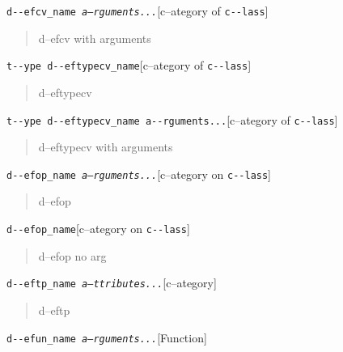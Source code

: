 \documentclass{book}
\begin{document}
\begin{titlepage}
\noindent\texttt{d{-}{-}efcv\_name \EmbracOn{}\textnormal{\textsl{a--rguments...}}\EmbracOff{}}\hfill[c--ategory of \texttt{c{-}{-}lass}]



%
\begin{quote}
d--efcv with arguments
\end{quote}

\noindent\texttt{t{-}{-}ype d{-}{-}eftypecv\_name}\hfill[c--ategory of \texttt{c{-}{-}lass}]



%
\begin{quote}
d--eftypecv
\end{quote}

\noindent\texttt{t{-}{-}ype d{-}{-}eftypecv\_name a{-}{-}rguments...}\hfill[c--ategory of \texttt{c{-}{-}lass}]



%
\begin{quote}
d--eftypecv with arguments
\end{quote}

\noindent\texttt{d{-}{-}efop\_name \EmbracOn{}\textnormal{\textsl{a--rguments...}}\EmbracOff{}}\hfill[c--ategory on \texttt{c{-}{-}lass}]



%
\begin{quote}
d--efop
\end{quote}

\noindent\texttt{d{-}{-}efop\_name}\hfill[c--ategory on \texttt{c{-}{-}lass}]



%
\begin{quote}
d--efop no arg
\end{quote}

\noindent\texttt{d{-}{-}eftp\_name \EmbracOn{}\textnormal{\textsl{a--ttributes...}}\EmbracOff{}}\hfill[c--ategory]



%
\begin{quote}
d--eftp
\end{quote}

\noindent\texttt{d{-}{-}efun\_name \EmbracOn{}\textnormal{\textsl{a--rguments...}}\EmbracOff{}}\hfill[Function]




\end{titlepage}
\end{document}
